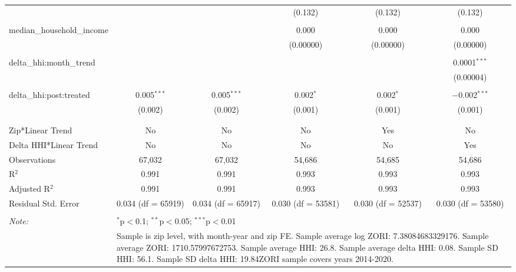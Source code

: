 \begin{table}[H]
{\begin{tabular}{@{\extracolsep{5pt}}lccccc}
   &  &  & (0.132) & (0.132) & (0.132) \\  

   & & & & & \\  

  median\_household\_income &  &  & 0.000 & 0.000 & 0.000 \\  

   &  &  & (0.00000) & (0.00000) & (0.00000) \\  

   & & & & & \\  

  delta\_hhi:month\_trend &  &  &  &  & 0.0001$^{***}$ \\  

   &  &  &  &  & (0.00004) \\  

   & & & & & \\  

  delta\_hhi:post:treated & 0.005$^{***}$ & 0.005$^{***}$ & 0.002$^{*}$ & 0.002$^{*}$ & $-$0.002$^{***}$ \\  

   & (0.002) & (0.002) & (0.001) & (0.001) & (0.001) \\  

   & & & & & \\  

 \hline \\[-1.8ex]  

 Zip*Linear Trend & No & No & No & Yes & No \\  

 Delta HHI*Linear Trend & No & No & No & No & Yes \\  

 Observations & 67,032 & 67,032 & 54,686 & 54,685 & 54,686 \\  

 R$^{2}$ & 0.991 & 0.991 & 0.993 & 0.993 & 0.993 \\  

 Adjusted R$^{2}$ & 0.991 & 0.991 & 0.993 & 0.993 & 0.993 \\  

 Residual Std. Error & 0.034 (df = 65919) & 0.034 (df = 65917) & 0.030 (df = 53581) & 0.030 (df = 52537) & 0.030 (df = 53580) \\  

 \hline  

 \hline \\[-1.8ex]  

 \textit{Note:}  & \multicolumn{5}{l}{$^{*}$p$<$0.1; $^{**}$p$<$0.05; $^{***}$p$<$0.01} \\  

  & \multicolumn{5}{l}{Sample is zip level, with month-year and zip FE. Sample average log ZORI: 7.38084683329176. Sample average ZORI: 1710.57997672753. Sample average HHI: 26.8. Sample average delta HHI: 0.08. Sample SD HHI: 56.1. Sample SD delta HHI: 19.84ZORI sample covers years 2014-2020.} \\  

 \end{tabular}}  

 \end{table}  

